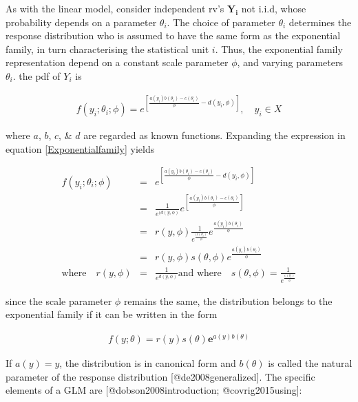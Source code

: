 \documentclass[]{article}
\begin{document}
As with the linear model, consider independent rv's \(\mathbf{Y_i}\) not
i.i.d, whose probability depends on a parameter \(\theta_i\). The choice
of parameter \(\theta_i\) determines the response distribution who is
assumed to have the same form as the exponential family, in turn
characterising the statistical unit \(i\). Thus, the exponential family
representation depend on a constant scale parameter \(\phi\), and
varying parameters \(\theta_i\). the pdf of \(Y_i\) is

\singlespacing

\begin{eqnarray}\label{Exponentialfamily}
f(y_i;\theta_i;\phi) = e^{\left[\frac{a(y_i)b(\theta_i) -c(\theta_i)}{\phi}-d(y_i,\phi)\right]}, \quad y_i \in X 
\end{eqnarray} \doublespacing

where \(a\), \(b\), \(c\), \& \(d\) are regarded as known functions.
Expanding the expression in equation \ref{Exponentialfamily} yields

\singlespacing

\begin{eqnarray}\label{Exponentialfamily}
f(y_i;\theta_i;\phi) &=& e^{\left[\frac{a(y_i)b(\theta_i) -c(\theta_i)}{\phi}-d(y_i,\phi)\right]} \nonumber\\
 &=& \frac{1}{e^{(d(y,\phi)}}e^{\left[\frac{a(y_i)b(\theta_i) -c(\theta_i)}{\phi}\right]} \nonumber\\
 &=& r(y,\phi)\frac{1}{e^{\frac{(c(\theta_i)}{\phi}}}e^{\frac{a(y_i)b(\theta_i)}{\phi}} \nonumber\\
 &=& r(y,\phi)s(\theta,\phi)e^{\frac{a(y_i)b(\theta_i)}{\phi}}\\
 \mbox{where} \quad r(y,\phi)&=& \frac{1}{e^{d(y,\phi)}} \mbox{and where}\quad s(\theta,\phi) = \frac{1}{e^{\frac{c(\theta_i)}{\phi}}}
\end{eqnarray} \doublespacing

since the scale parameter \(\phi\) remains the same, the distribution
belongs to the exponential family if it can be written in the form

\singlespacing

\begin{eqnarray}\label{Exponential}
f(y;\theta) = r(y)s(\theta)\mathbf{e}^{a(y)b(\theta)}
\end{eqnarray} \doublespacing

If \(a(y) = y\), the distribution is in canonical form and \(b(\theta)\)
is called the natural parameter of the response distribution
{[}@de2008generalized{]}. The specific elements of a GLM are
{[}@dobson2008introduction; @covrig2015using{]}:
\end{document}
